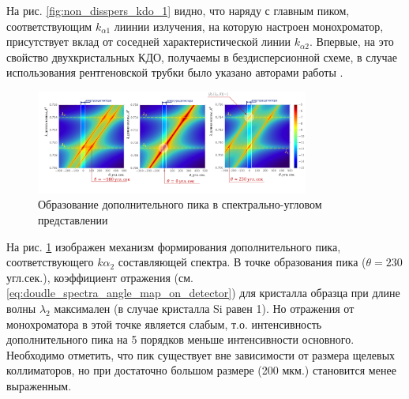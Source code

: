 На рис. \ref{fig:non_disspers_kdo_1} видно, что наряду с главным пиком, соответствующим $k_{\alpha1}$ лиинии
излучения, на которую настроен монохроматор, присутствует вклад от соседней характеристической линии
 $k_{\alpha2}$. Впервые, на это свойство двухкристальных КДО, получаемы в бездисперсионной
схеме, в случае использования рентгеновской трубки было указано авторами работы \cite{chuev2008}.

\begin{figure}[H]
  \centering
  \includegraphics[width=0.8\textwidth]{images/vklad_kalpha2.png}
  \caption{Образование дополнительного пика в спектрально-угловом представлении}
  \label{ris:vklad_kalpha2}
\end{figure}

На рис. \ref{ris:vklad_kalpha2} изображен механизм формирования дополнительного пика,
соответствующего $k\alpha_2$ составляющей спектра. В точке образования пика ($\theta = 230$ угл.сек.), коэффициент
отражения  (см. \ref{eq:doudle_spectra_angle_map_on_detector})
для кристалла образца при длине волны $\lambda_2$ максимален (в случае кристалла Si равен 1). Но отражения
от монохроматора в этой точке является слабым, т.о. интенсивность дополнительного пика на 5 порядков меньше
интенсивности основного. Необходимо отметить, что пик существует вне зависимости от размера щелевых коллиматоров, но
при достаточно большом размере (200 мкм.) становится менее выраженным.
